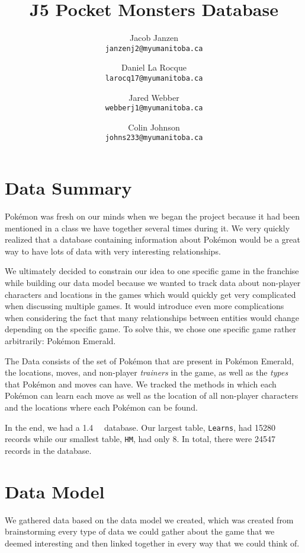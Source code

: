 \documentclass{article}
\title{J5 Pocket Monsters Database}
\author{
    Jacob Janzen\\
    \texttt{janzenj2@myumanitoba.ca} \and 
    Daniel La Rocque\\
    \texttt{larocq17@myumanitoba.ca} \and 
    Jared Webber\\
    \texttt{webberj1@myumanitoba.ca} \and 
    Colin Johnson\\
    \texttt{johns233@myumanitoba.ca}
}
\begin{document}
\maketitle
\section{Data Summary}
Pok\'emon was fresh on our minds when we began the project because it had been mentioned in a 
class we have together several times during it. We very quickly realized that
a database containing information about Pok\'emon would be a great way to have lots of data with
very interesting relationships.

We ultimately decided to constrain our idea to one specific game in the franchise while building
our data model because we wanted to track data about non-player characters and locations in the
games which would quickly get very complicated when discussing multiple games. It would introduce
even more complications when considering the fact that many relationships between entities would
change depending on the specific game. To solve this, we chose one specific game rather 
arbitrarily: Pok\'emon Emerald.

The Data consists of the set of Pok\'emon that are present in Pok\'emon Emerald, the locations, 
moves, and non-player \emph{trainers} in the game, as well as the \emph{types} that Pok\'emon 
and moves can have. We tracked the methods in which each Pok\'emon can learn each move as well as 
the location of all non-player characters and the locations where each Pok\'emon can be found.

In the end, we had a \SI{1.4}{\mega\byte} database. Our largest table, \verb+Learns+, had 15280
records while our smallest table, \verb+HM+, had only 8. In total, there were 24547 records in
the database.

\section{Data Model}
We gathered data based on the data model we created, which was created from brainstorming every
type of data we could gather about the game that we deemed interesting and then linked together
in every way that we could think of.
\end{document}
